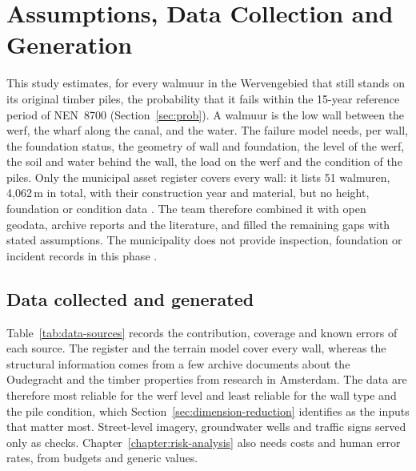 \clearpage
\section{Assumptions, Data Collection and Generation}
\label{sec:assumptions}\label{sec:data}


This study estimates, for every walmuur in the Wervengebied that still stands
on its original timber piles, the probability that it fails within the
15-year reference period of NEN~8700 (Section~\ref{sec:prob}). A walmuur is
the low wall between the werf, the wharf along the canal, and the water. The
failure model needs, per wall, the foundation status, the geometry of wall and
foundation, the level of the werf, the soil and water behind the wall, the
load on the werf and the condition of the piles. Only the municipal asset
register covers every wall: it lists 51 walmuren, 4{,}062\,m in total, with
their construction year and material, but no height, foundation or condition
data \parencite{gu2025register}. The team therefore combined it with open
geodata, archive reports and the literature, and filled the remaining gaps
with stated assumptions. The municipality does not provide inspection,
foundation or incident records in this phase \parencite{utrecht_qa2026}.

\subsection{Data collected and generated}\label{sec:data-collected}\label{sec:data-generated}

Table~\ref{tab:data-sources} records the contribution, coverage and known
errors of each source. The register and the terrain model cover every wall,
whereas the structural information comes from a few archive documents about
the Oudegracht and the timber properties from research in Amsterdam. The data
are therefore most reliable for the werf level and least reliable for the
wall type and the pile condition, which Section~\ref{sec:dimension-reduction}
identifies as the inputs that matter most. Street-level imagery, groundwater wells and traffic signs served only as checks. Chapter~\ref{chapter:risk-analysis}
also needs costs and human error rates, from budgets and generic values.

